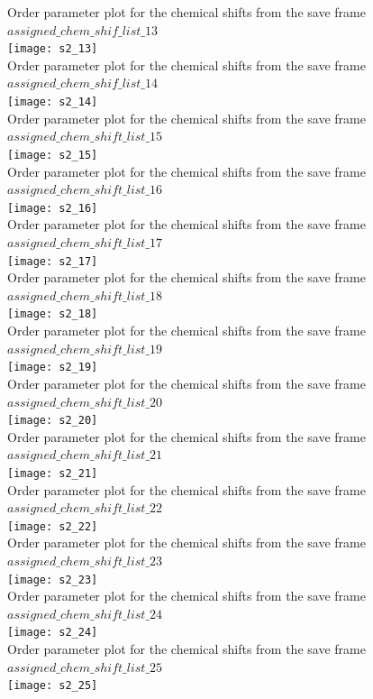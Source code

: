 Order parameter plot for the chemical shifts from the  save frame $assigned\_chem\_shif\_list\_13$\\ \texttt{[image: s2\_13]}\\
Order parameter plot for the chemical shifts from the  save frame $assigned\_chem\_shif\_list\_14$\\ \texttt{[image: s2\_14]}\\
Order parameter plot for the chemical shifts from the  save frame $assigned\_chem\_shift\_list\_15$\\ \texttt{[image: s2\_15]}\\
Order parameter plot for the chemical shifts from the  save frame $assigned\_chem\_shift\_list\_16$\\ \texttt{[image: s2\_16]}\\
Order parameter plot for the chemical shifts from the  save frame $assigned\_chem\_shift\_list\_17$\\ \texttt{[image: s2\_17]}\\
Order parameter plot for the chemical shifts from the  save frame $assigned\_chem\_shift\_list\_18$\\ \texttt{[image: s2\_18]}\\
Order parameter plot for the chemical shifts from the  save frame $assigned\_chem\_shift\_list\_19$\\ \texttt{[image: s2\_19]}\\
Order parameter plot for the chemical shifts from the  save frame $assigned\_chem\_shift\_list\_20$\\ \texttt{[image: s2\_20]}\\
Order parameter plot for the chemical shifts from the  save frame $assigned\_chem\_shift\_list\_21$\\ \texttt{[image: s2\_21]}\\
Order parameter plot for the chemical shifts from the  save frame $assigned\_chem\_shift\_list\_22$\\ \texttt{[image: s2\_22]}\\
Order parameter plot for the chemical shifts from the  save frame $assigned\_chem\_shift\_list\_23$\\ \texttt{[image: s2\_23]}\\
Order parameter plot for the chemical shifts from the  save frame $assigned\_chem\_shift\_list\_24$\\ \texttt{[image: s2\_24]}\\
Order parameter plot for the chemical shifts from the  save frame $assigned\_chem\_shift\_list\_25$\\ \texttt{[image: s2\_25]}\\
